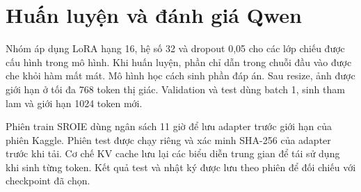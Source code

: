 \section{Huấn luyện và đánh giá Qwen}
Nhóm áp dụng LoRA hạng 16, hệ số 32 và dropout 0,05 cho các lớp chiếu được cấu hình trong mô hình. Khi huấn luyện, phần chỉ dẫn trong chuỗi đầu vào được che khỏi hàm mất mát. Mô hình học cách sinh phần đáp án. Sau resize, ảnh được giới hạn ở tối đa 768 token thị giác. Validation và test dùng batch 1, sinh tham lam và giới hạn 1024 token mới.

Phiên train SROIE dùng ngân sách 11 giờ để lưu adapter trước giới hạn của phiên Kaggle. Phiên test được chạy riêng và xác minh SHA-256 của adapter trước khi tải. Cơ chế KV cache lưu lại các biểu diễn trung gian để tái sử dụng khi sinh từng token. Kết quả test và nhật ký được lưu theo phiên để đối chiếu với checkpoint đã chọn.

